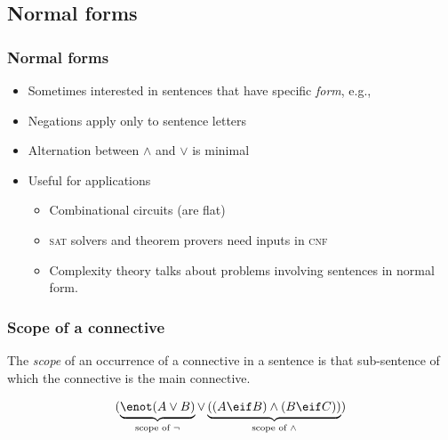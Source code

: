 \newhourlecture
\subsection{Normal forms}

\begin{frame}
  \frametitle{Normal forms}

  \begin{itemize}[<+->]
    \item Sometimes interested in sentences that have specific \emph{form}, e.g.,
    \item Negations apply only to sentence letters
    \item Alternation between $\land$ and $\lor$ is minimal
    \item Useful for applications
    \begin{itemize}
      \item Combinational circuits (are flat)
      \item \textsc{sat} solvers and theorem provers need inputs in \textsc{cnf}
      \item Complexity theory talks about problems involving sentences in normal form.
    \end{itemize}
  \end{itemize}
\end{frame}

\begin{frame}
  \frametitle{Scope of a connective}

  \begin{definition}
    The \emph{scope} of an occurrence of a connective in a sentence is that sub-sentence of which the connective is the main connective.
  \end{definition}

  \[(\underbrace{\enot(A \lor B)}_{\text{scope of } \lnot} \lor \underbrace{((A \eif B) \land (B \eif C))}_{\text{scope of }\land})\]
\end{frame}

